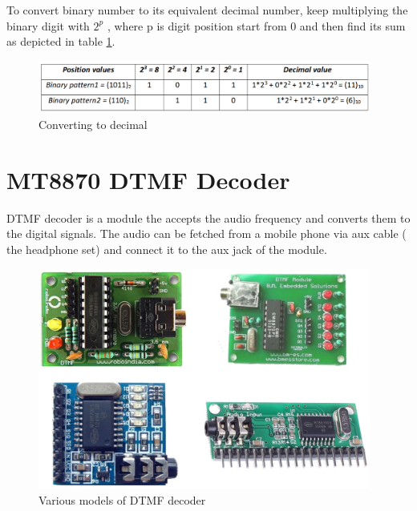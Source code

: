 To convert binary number to its equivalent decimal number, keep multiplying the binary digit with $2^p$ , where p is digit position start from 0 and then find its sum as depicted in table \ref{fig:bin_to_dec}.

\begin{figure}
    \centering
    \includegraphics[width=4.3in]{Tables/DTMF/binary_decimal.png}
    \caption[Binary to decimal]{Converting to decimal}
    \label{fig:bin_to_dec}
\end{figure}

\section{MT8870 DTMF Decoder}

\ac{DTMF} decoder is a module the accepts the audio frequency and converts them to the digital signals. The audio can be fetched from a mobile phone via aux cable ( the headphone set) and connect it to the aux jack of the module. 

\begin{figure}
    \centering
    \includegraphics[width=4.3in]{Images/DTMF/DTMF_series.png}
    \caption[MT8870 DTMF decoder]{Various models of \ac{DTMF} decoder}
\end{figure}

